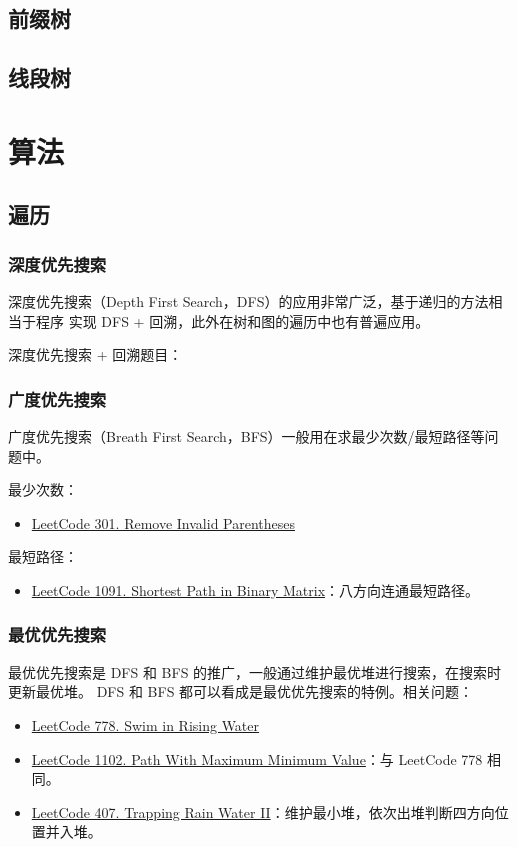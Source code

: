 \section{前缀树}

\section{线段树}

\chapter{算法}
\section{遍历}
\subsection{深度优先搜索}
深度优先搜索（Depth First Search，DFS）的应用非常广泛，基于递归的方法相当于程序
实现 DFS + 回溯，此外在树和图的遍历中也有普遍应用。

深度优先搜索 + 回溯题目：

\subsection{广度优先搜索}
广度优先搜索（Breath First Search，BFS）一般用在求最少次数/最短路径等问题中。

最少次数：
\begin{itemize}
  \item
    \href{https://leetcode.com/problems/remove-invalid-parentheses/}{LeetCode 301. Remove Invalid Parentheses}
\end{itemize}

最短路径：
\begin{itemize}
  \item
    \href{https://leetcode.com/problems/shortest-path-in-binary-matrix/}{LeetCode
      1091. Shortest Path in Binary Matrix}：八方向连通最短路径。
\end{itemize}

\subsection{最优优先搜索}
最优优先搜索是 DFS 和 BFS 的推广，一般通过维护最优堆进行搜索，在搜索时更新最优堆。
DFS 和 BFS 都可以看成是最优优先搜索的特例。相关问题：

\begin{itemize}
  \item
    \href{https://leetcode.com/problems/swim-in-rising-water/}{LeetCode 778. Swim in Rising Water}
  \item
    \href{https://leetcode.com/problems/path-with-maximum-minimum-value}{LeetCode
      1102. Path With Maximum Minimum Value}：与 LeetCode 778 相同。
  \item
    \href{https://leetcode.com/problems/trapping-rain-water-ii/}{LeetCode 407.
      Trapping Rain Water II}：维护最小堆，依次出堆判断四方向位置并入堆。
\end{itemize}


